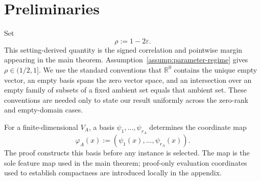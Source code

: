 \section{Preliminaries}

Set
\[
\rho:=1-2\varepsilon.
\]
This setting-derived quantity is the signed correlation and pointwise margin
appearing in the main theorem.  Assumption~\ref{assump:parameter-regime} gives
\(\rho\in(1/2,1]\).  We use the standard conventions that
\(\mathbb R^0\) contains the unique empty vector, an empty basis spans the
zero vector space, and an intersection over an empty family of subsets of a
fixed ambient set equals that ambient set.  These conventions are needed only
to state our result uniformly across the zero-rank and empty-domain cases.

For a finite-dimensional \(V_A\), a basis
\(\psi_1,\ldots,\psi_{r_A}\) determines the coordinate map
\[
\varphi_A(x):=(\psi_1(x),\ldots,\psi_{r_A}(x)).
\]
The proof constructs this basis before any instance is selected.  The map is
the sole feature map used in the main theorem; proof-only evaluation
coordinates used to establish compactness are introduced locally in the
appendix.
